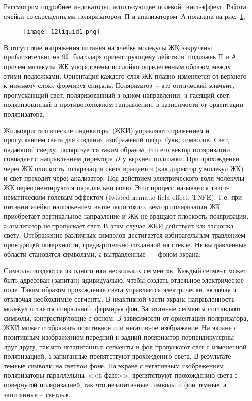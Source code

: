 Рассмотрим подробнее индикаторы, использующие полевой твист-эффект. Работа ячейки со скрещенными поляризатором~П и анализатором~А показана на рис.~\ref{pic:12liquid1}.

\begin{figure}[h!]
	\texttt{[image: 12liquid1.png]}
	\label{pic:12liquid1}
\end{figure}

В отсутствие напряжения питания на ячейке молекулы ЖК закручены приблизительно на 90$ ^\circ $ благодаря ориентирующему действию подложек П и А, причем молекулы ЖК упорядочены послойно определенным образом между этими подложками. Ориентация каждого слоя ЖК плавно изменяется от верхнего к нижнему слою, формируя спираль. Поляризатор~-- это оптический элемент, пропускающий свет, поляризованный в одном направлении, и гасящий свет, поляризованный в противоположном направлении, в зависимости от ориентации поляризатора.

Жидкокристаллические индикаторы (ЖКИ) управляют отражением и пропусканием света для создания изображений цифр, букв, символов. Свет, падающий сверху, поляризуется таким образом, что его вектор поляризации совпадает с направлением директора $ D $ у верхней подложки. При прохождении через ЖК плоскость поляризации света вращается (как директор у молекул ЖК) и свет проходит через анализатор. Под действием электрического поля молекулы ЖК переориентируются параллельно полю. Этот процесс называется твист-нематическим полевым эффектом (twisted nematic field effect, TNFE). Т.е. при питании ячейки напряжением выше порогового, вектор поляризации ЖК приобретает вертикальное направление и ЖК не вращают плоскость поляризации, а анализатор не пропускает свет. В этом случае ЖКИ действует как заслонка свету. Отображение различных символов достигается избирательным травлением проводящей поверхности, предварительно созданной на стекле. Не вытравленные области становятся символами, а вытравленные~--- фоном экрана.

Символы создаются из одного или нескольких сегментов. Каждый сегмент может быть адресован (запитан) идивидуально, чтобы создать отдельное электрическое поле. Таким образом прохождение света управляется электрически, включая и отключая необходимые сегменты. В неактивной части экрана направленность молекул остается спиральной, формируя фон. Запитанные сегменты составляют символы, контрастирующие с фоном. В зависимости от ориентации поляризатора, ЖКИ может отображать позитивное или негативное изображение. На экране с позитивным изображением передний и задний поляризатор перпендикулярны друг другу, так что незапитанные сегменты и фон пропускают свет с измененной поляризацией, а запитанные препятствуют прохождению света. В результате --- темные символы на светлом фоне. На экране с негативным изображением поляризаторы параллельны, <<в фазе>>, препятствуют прохождению света с повернутой поляризацией, так что незапитанные символы и фон темные, а запитанные -- светлые. 

